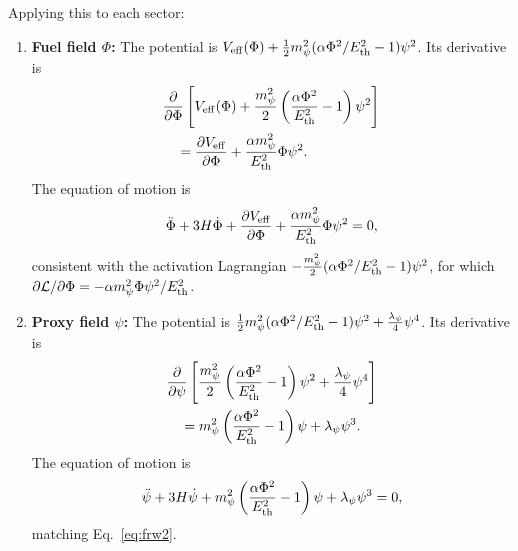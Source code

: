 \documentclass[epj]{svjour}
\begin{document}
Applying this to each sector:

\begin{enumerate}
\item \textbf{Fuel field \(\Phi\):} The potential is
      \(V_{\rm eff}(\Phi) +
      \frac{1}{2}m_\psi^2(\alpha\Phi^2/E_{\rm th}^2-1)\psi^2\).
      Its derivative is
      \begin{equation}
      \begin{split}
      &\frac{\partial}{\partial\Phi}\left[V_{\rm eff}(\Phi)
      + \frac{m_\psi^2}{2}\left(\frac{\alpha\Phi^2}{E_{\rm th}^2}-1\right)\psi^2\right] \\
      &\quad= \frac{\partial V_{\rm eff}}{\partial\Phi}
      + \frac{\alpha m_\psi^2}{E_{\rm th}^2}\Phi\psi^2.
      \end{split}
      \end{equation}
      The equation of motion is
      \begin{equation}
      \ddot\Phi + 3H\dot\Phi + \frac{\partial V_{\rm eff}}{\partial\Phi}
      + \frac{\alpha m_\psi^2}{E_{\rm th}^2}\Phi\psi^2 = 0,
      \label{eq:Phi_eom}
      \end{equation}
      consistent with the activation Lagrangian
      \(-\frac{m_\psi^2}{2}(\alpha\Phi^2/E_{\rm th}^2-1)\psi^2\),
      for which \(\partial\mathcal L/\partial\Phi
      =-\alpha m_\psi^2\Phi\psi^2/E_{\rm th}^2\).

\item \textbf{Proxy field \(\psi\):} The potential is
      \(\frac{1}{2}m_\psi^2(\alpha\Phi^2/E_{\rm th}^2-1)\psi^2
      +\frac{\lambda_\psi}{4}\psi^4\). Its derivative is
      \begin{equation}
      \begin{split}
      &\frac{\partial}{\partial\psi}\left[
      \frac{m_\psi^2}{2}\left(\frac{\alpha\Phi^2}{E_{\rm th}^2}-1\right)\psi^2
      + \frac{\lambda_\psi}{4}\psi^4\right] \\
      &\quad= m_\psi^2\left(\frac{\alpha\Phi^2}{E_{\rm th}^2}-1\right)\psi
      + \lambda_\psi\psi^3.
      \end{split}
      \end{equation}
      The equation of motion is
      \begin{equation}
      \ddot\psi + 3H\dot\psi
      + m_\psi^2\left(\frac{\alpha\Phi^2}{E_{\rm th}^2}-1\right)\psi
      + \lambda_\psi\psi^3 = 0,
      \end{equation}
      matching Eq.~\eqref{eq:frw2}.


\end{enumerate}
\end{document}
